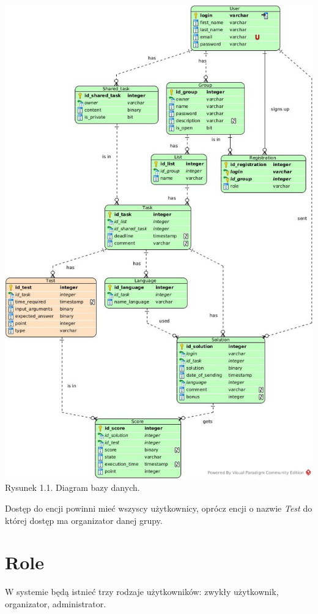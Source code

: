 \documentclass[a4paper]{mwart}
\begin{document}
\begin{center}	
	\includegraphics[scale=0.5]{diagram.jpg} \\
	Rysunek 1.1. Diagram bazy danych.
\end{center}
Dostęp do encji powinni mieć wszyscy użytkownicy, oprócz encji o nazwie \emph{Test} do której dostęp ma organizator danej grupy. 

\newpage

\section{Role}
W systemie będą istnieć trzy rodzaje użytkowników: zwykły użytkownik, organizator, administrator.
\end{document}
